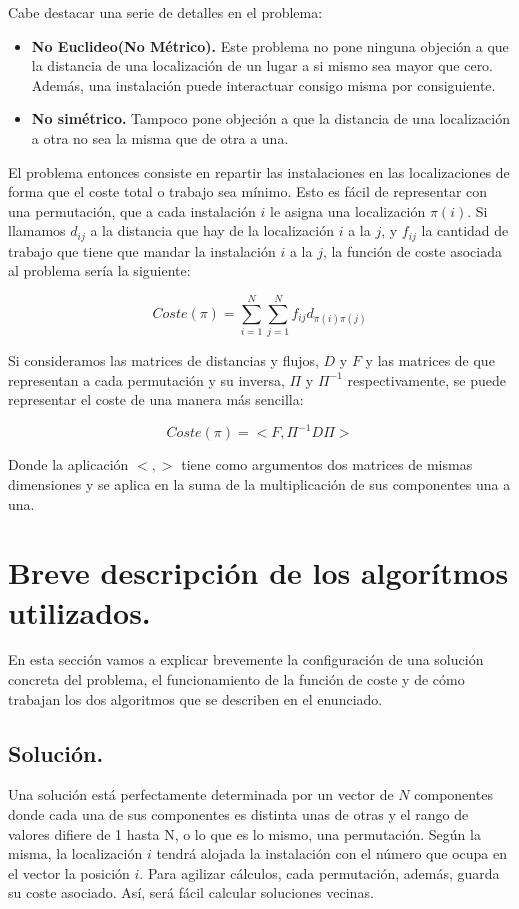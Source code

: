 Cabe destacar una serie de detalles en el problema:

\begin{itemize}
	\item \textbf{No Euclideo(No Métrico).} Este problema  no pone ninguna objeción a que la distancia de una localización de un lugar a si mismo sea mayor que cero. Además, una instalación puede interactuar consigo misma por consiguiente.
	\item \textbf{No simétrico.} Tampoco pone objeción a que la distancia de una localización a otra no sea la misma que de otra a una.
\end{itemize}

El problema entonces consiste en repartir las instalaciones en las localizaciones de forma que el coste total o trabajo sea mínimo. Esto es fácil de representar con una permutación, que a cada instalación $i$ le asigna una localización $\pi(i)$. Si llamamos $d_{ij}$ a la distancia que hay de la localización $i$ a la $j$, y $f_{ij}$ la cantidad de trabajo que tiene que mandar la instalación $i$ a la $j$, la función de coste asociada al problema sería la siguiente:

\[Coste(\pi)=\sum_{i=1}^{N}\sum_{j=1}^{N}f_{ij}d_{\pi(i)\pi(j)}\]

Si consideramos las matrices de distancias y flujos, $D$ y $F$ y las matrices de que representan a cada permutación y su inversa, $\Pi$ y $\Pi^{-1}$ respectivamente, se puede representar el coste de una manera más sencilla:

\[Coste(\pi)=<F,\Pi^{-1}D\Pi> \]

Donde la aplicación $<,>$ tiene como argumentos dos matrices de mismas dimensiones y se aplica en la suma de la multiplicación de sus componentes una a una. 

\newpage

\section{Breve descripción de los algorítmos utilizados.}
En esta sección vamos a explicar brevemente la configuración de una solución concreta del problema, el funcionamiento de la función de coste y de cómo trabajan los dos algoritmos que se describen en el enunciado.

\subsection{Solución.}

Una solución está perfectamente determinada por un vector de $N$ componentes donde cada una de sus componentes es distinta unas de otras y el rango de valores difiere de 1 hasta N, o lo que es lo mismo, una permutación. Según la misma, la localización $i$ tendrá alojada la instalación con el número que ocupa en el vector la posición $i$. Para agilizar cálculos, cada permutación, además, guarda su coste asociado. Así, será fácil calcular soluciones vecinas.

